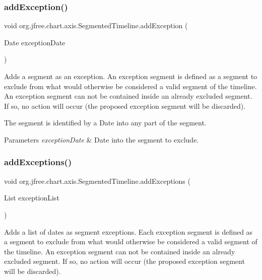 \subsubsection{\texorpdfstring{add\+Exception()}{addException()}\hspace{0.1cm}{\footnotesize\ttfamily [3/3]}}
{\footnotesize\ttfamily void org.\+jfree.\+chart.\+axis.\+Segmented\+Timeline.\+add\+Exception (\begin{DoxyParamCaption}\item[{Date}]{exception\+Date }\end{DoxyParamCaption})}

Adds a segment as an exception. An exception segment is defined as a segment to exclude from what would otherwise be considered a valid segment of the timeline. An exception segment can not be contained inside an already excluded segment. If so, no action will occur (the proposed exception segment will be discarded). 

The segment is identified by a Date into any part of the segment.


\begin{DoxyParams}{Parameters}
{\em exception\+Date} & Date into the segment to exclude. \\
\hline
\end{DoxyParams}
\mbox{\label{classorg_1_1jfree_1_1chart_1_1axis_1_1_segmented_timeline_aae0346d4f75b9ee81d6345ffb7feb7b7}} 
\subsubsection{\texorpdfstring{add\+Exceptions()}{addExceptions()}}
{\footnotesize\ttfamily void org.\+jfree.\+chart.\+axis.\+Segmented\+Timeline.\+add\+Exceptions (\begin{DoxyParamCaption}\item[{List}]{exception\+List }\end{DoxyParamCaption})}

Adds a list of dates as segment exceptions. Each exception segment is defined as a segment to exclude from what would otherwise be considered a valid segment of the timeline. An exception segment can not be contained inside an already excluded segment. If so, no action will occur (the proposed exception segment will be discarded). 

